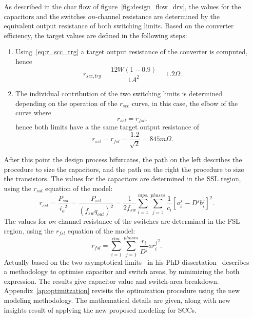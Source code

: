 As described  in the char flow of figure~\ref{fig:design_flow_drv}, the values for the capacitors and the switches $on$-channel resistance are determined by the equivalent output resistance of both switching limits. Based on the converter efficiency, the target values are defined in the following steps:
\begin{enumerate}
  \item Using~\eqref{eq:r_scc_trg} a target output resistance of the converter is computed, hence
      \begin{equation}
        r_{scc,trg}= \frac{12W (1-0.9)} {1A^2} = 1.2\Omega .
      \end{equation}

  \item The individual contribution of the two switching limits is determined depending on the operation of the $r_{scc}$ curve, in this case, the elbow of the curve where
       \begin{equation}
        r_{ssl} = r_{fsl},
      \end{equation}
      hence both limits have a the same target output resistance of \begin{equation}
        r_{ssl} = r_{fsl} = \frac{1.2}{\sqrt{2}}=845m\Omega.
      \end{equation}

\end{enumerate}


After this point the design process bifurcates, the path on the left describes the procedure to size the capacitors, and the path on the right the procedure to size the transistors. The values for the capacitors are determined in the SSL region, using the $r_{ssl}$ equation of the model:
\begin{equation}
r_{ssl}=\frac{P_{ssl}}{{i_o}^2}=\frac{P_{ssl}}{{(f_{sw} {q_{out}})}^2}=\frac{1}{2 f_{sw}}\sum_{i=1}^{caps.}\sum_{j=1}^{phases}\frac{1}{c_i}{\left[a_{i\
}^j-{D^j} {b_i^j}\right]}^2.
\label{eq:r_ssl_dsg}
\end{equation}
The values for $on$-channel resistance of the switches are determined in the FSL region, using the $r_{fsl}$ equation of the model:
\begin{equation}
r_{fsl}=\sum_{i=1}^{elm.}\sum_{j=1}^{phases}\frac{r_i}{D^j}{ar_i^j}^2.
\label{eq:r_fsl_dsg}
\end{equation}
Actually based on the two asymptotical limits~\citeauthor{Seeman:EECS-2009-78} in his PhD dissertation~\cite{Seeman:EECS-2009-78} describes a methodology to optimise capacitor and switch areas, by minimizing the both expression. The results give capacitor value  and switch-area breakdown. Appendix~\ref{ap:optimitzation} revisits the optimization procedure using the new modeling methodology. The mathematical details are given, along with new insights result of applying the new proposed modeling for SCCs.



